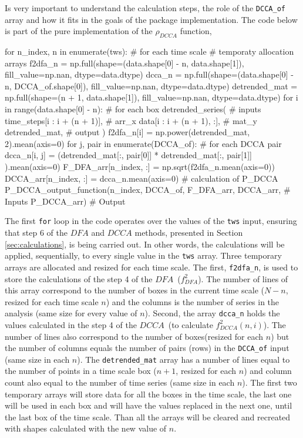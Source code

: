 \documentclass[nojss]{jss}
\begin{document}
Is very important to understand the calculation steps, the role of the \verb"DCCA_of" array and how it fits in the goals of the package implementation. The code below is part of the pure  implementation of the $\rho_{DCCA}$ function, 

\begin{Code}
for n_index, n  in enumerate(tws): # for each time scale
  # temporaty allocation arrays
  f2dfa_n = np.full(shape=(data.shape[0] - n, data.shape[1]),
  fill_value=np.nan, dtype=data.dtype)
  dcca_n = np.full(shape=(data.shape[0] - n, DCCA_of.shape[0]), 
  fill_value=np.nan, dtype=data.dtype)
  detrended_mat = np.full(shape=(n + 1, data.shape[1]), 
  fill_value=np.nan, dtype=data.dtype)
  for i in range(data.shape[0] - n): # for each box
      detrended_series( # inputs
                        time_steps[i : i + (n + 1)],  # arr_x
                        data[i : i + (n + 1), :],  # mat_y
                         detrended_mat,  # output
                      )
      f2dfa_n[i] = np.power(detrended_mat, 2).mean(axis=0)
      for j, pair in enumerate(DCCA_of): # for each DCCA pair
          dcca_n[i, j] = (detrended_mat[:, pair[0]] * detrended_mat[:, pair[1]]
                         ).mean(axis=0)
  F_DFA_arr[n_index, :] = np.sqrt(f2dfa_n.mean(axis=0))
  DCCA_arr[n_index, :] = dcca_n.mean(axis=0)
  # calculation of P_DCCA
  P_DCCA_output_function(n_index, DCCA_of, F_DFA_arr, DCCA_arr, # Inputs
  P_DCCA_arr) # Output
\end{Code}

The first \verb"for" loop in the code operates over the values of the \verb"tws" input, ensuring that step 6 of the $DFA$ and $DCCA$ methods, presented in Section \ref{sec:calculations}, is being carried out. In other words, the calculations will be applied, sequentially, to every single value in the \verb"tws" array. Three temporary arrays are allocated and resized for each time scale. The first, \verb"f2dfa_n", is used to store the calculations of the step 4 of the $DFA$~($f_{DFA}^{2}$). The number of lines of this array correspond to the number of boxes in the current time scale ($N - n$, resized for each time scale $n$) and the columns is the number of series in the analysis (same size for every value of $n$). Second, the array  \verb"dcca_n" holds the values calculated in the step 4 of the $DCCA$~(to calculate $f_{DCCA}^{2}(n, i)$). The number of lines also correspond to the number of boxes(resized for each $n$) but the number of columns equals the number of pairs (rows) in the \verb"DCCA_of" input (same size in each $n$). The \verb"detrended_mat" array has a number of lines equal to the number of points in a time scale box ($n +1$, resized for each $n$) and column count also equal to the number of time series (same size in each $n$). The first two temporary arrays will store data for all the boxes in the time scale, the last one will be used in each box and will have the values replaced in the next one, until the last box of the time scale. Than all the arrays will be cleared and recreated with shapes calculated with the new value of $n$.
\end{document}
